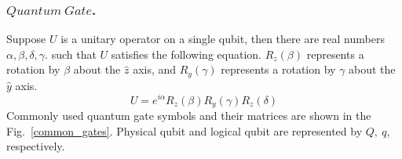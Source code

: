 \documentclass[runningheads]{llncs}
\begin{document}
\subsubsection{$Quantum \ Gate$.}
Suppose $U$ is a unitary operator on a single qubit,
 then there are real numbers $\alpha, \beta, \delta, \gamma$.
such that $U$ satisfies the following equation.
$R_{z}(\beta)$ represents a rotation by $\beta$ about the $\hat{z}$ axis, 
and $R_{y}(\gamma)$ represents a rotation by $\gamma$ about the $\hat{y}$ axis.
 \begin{equation}
	U=e^{i\alpha}R_{z}(\beta)R_{y}(\gamma)R_{z}(\delta)
\end{equation}
Commonly used quantum gate symbols and their matrices are shown in the Fig.~\ref{common_gates}. 
Physical qubit and logical qubit are represented by $Q ,\ q $, respectively.
 {
\begin{figure}
	 \begin{center}
\end{center}
\end{figure}}
\end{document}
